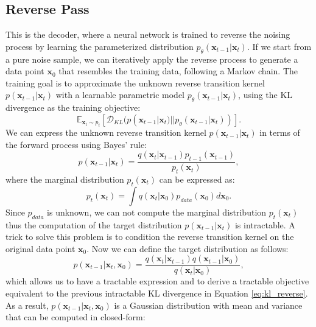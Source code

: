 \subsection{Reverse Pass}
This is the decoder, where a neural network is trained to reverse the noising process by learning the parameterized 
distribution $p_{\theta}(\mathbf{x}_{t-1}|\mathbf{x}_t)$. If we start from a pure noise sample, we can iteratively apply the reverse process 
to generate a data point $\mathbf{x}_0$ that resembles the training data, following a Markov chain. The training goal is to approximate the unknown reverse transition 
kernel $p(\mathbf{x}_{t-1}|\mathbf{x}_t)$ with a learnable parametric model $p_{\theta}(\mathbf{x}_{t-1}|\mathbf{x}_t)$, using the KL divergence 
as the training objective: 
\begin{equation}\label{eq:kl_reverse}
    \mathbb{E}_{\mathbf{x}_t \sim p_t} \left[ \mathcal{D}_{KL}(p(\mathbf{x}_{t-1}|\mathbf{x}_t) || p_{\theta}(\mathbf{x}_{t-1}|\mathbf{x}_t)) \right].
\end{equation}
We can express the unknown reverse transition kernel $p(\mathbf{x}_{t-1}|\mathbf{x}_t)$ in terms of the forward process using Bayes' rule:
\begin{equation}
    p(\mathbf{x}_{t-1}|\mathbf{x}_t) = \frac{q(\mathbf{x}_t|\mathbf{x}_{t-1}) p_{t-1}(\mathbf{x}_{t-1})}{p_t(\mathbf{x}_t)},
\end{equation}
where the marginal distribution $p_t(\mathbf{x}_t)$ can be expressed as:
\begin{equation}
    p_t(\mathbf{x}_t) = \int q(\mathbf{x}_t|\mathbf{x}_0) p_{data}(\mathbf{x}_0) d\mathbf{x}_0.
\end{equation}
Since $p_{data}$ is unknown, we can not compute the marginal distribution $p_t(\mathbf{x}_t)$ thus the computation of the target distribution 
$p(\mathbf{x}_{t-1}|\mathbf{x}_t)$ is intractable. A trick to solve this problem is to condition the reverse transition kernel on the original data 
point $\mathbf{x}_0$. Now we can define the target distribution as follows:
\begin{equation}
    p(\mathbf{x}_{t-1}|\mathbf{x}_t, \mathbf{x}_0) = \frac{q(\mathbf{x}_t|\mathbf{x}_{t-1}) q(\mathbf{x}_{t-1}|\mathbf{x}_0)}{q(\mathbf{x}_t|\mathbf{x}_0)},
\end{equation}
which allows us to have a tractable expression and to derive a tractable objective equivalent to the previous intractable KL divergence in Equation \ref{eq:kl_reverse}. 
As a result, $p(\mathbf{x}_{t-1}|\mathbf{x}_t, \mathbf{x}_0)$ is a Gaussian distribution with mean and variance that can be computed in closed-form: 

